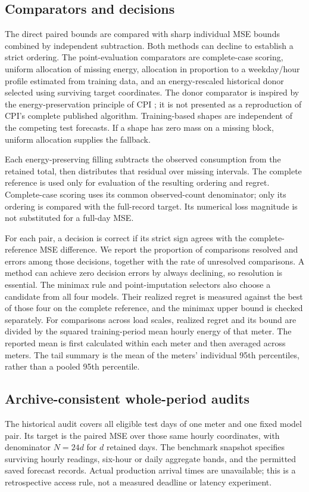 \documentclass[12pt]{article}
\begin{document}
\subsection{Comparators and decisions}
The direct paired bounds are compared with sharp individual MSE bounds
combined by independent subtraction. Both methods can decline to establish
a strict ordering. The point-evaluation comparators are complete-case
scoring, uniform allocation of missing energy, allocation in proportion to
a weekday/hour profile estimated from training data, and an energy-rescaled
historical donor selected using surviving target coordinates. The donor
comparator is inspired by the energy-preservation principle of CPI
\cite{cpi}; it is not presented as a reproduction of CPI's complete
published algorithm. Training-based shapes are independent of the competing
test forecasts. If a shape has zero mass on a missing block, uniform
allocation supplies the fallback.

Each energy-preserving filling subtracts the observed consumption from
the retained total, then distributes that residual over missing intervals.
The complete reference is used only for evaluation of the resulting
ordering and regret. Complete-case scoring uses its common observed-count
denominator; only its ordering is compared with the full-record target.
Its numerical loss magnitude is not substituted for a full-day MSE.

For each pair, a decision is correct if its strict sign agrees with the
complete-reference MSE difference. We report the proportion of comparisons
resolved and errors among those decisions, together with the rate of
unresolved comparisons. A method can achieve zero decision errors by
always declining, so resolution is essential. The minimax rule and
point-imputation selectors also choose a candidate from all four models.
Their realized regret is measured against the best of those four on the
complete reference, and the minimax upper bound is checked separately.
For comparisons across load scales, realized regret and its bound are
divided by the squared training-period mean hourly energy of that meter.
The reported mean is first calculated within each meter and then averaged
across meters. The tail summary is the mean of the meters' individual
95th percentiles, rather than a pooled 95th percentile.

\subsection{Archive-consistent whole-period audits}\label{sec:period-information}
The historical audit covers all eligible test days of one meter and one
fixed model pair. Its target is the paired MSE over those same hourly
coordinates, with denominator $N=24d$ for $d$ retained days. The benchmark
snapshot specifies surviving hourly readings, six-hour or daily aggregate
bands, and the permitted saved forecast records. Actual production arrival
times are unavailable; this is a retrospective access rule, not a measured
deadline or latency experiment.
\end{document}
